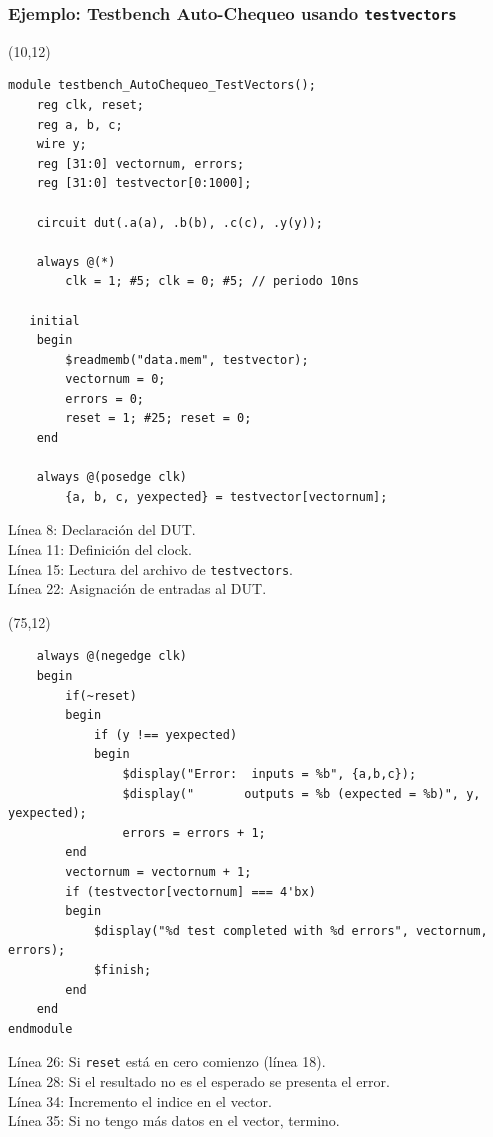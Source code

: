 \documentclass[aspectratio=169]{beamer}
\begin{document}
\begin{frame}[fragile,t]
    \frametitle{Ejemplo: Testbench Auto-Chequeo usando \texttt{testvectors}}

    \begin{textblock}{55}(10,12)
\lstset{basicstyle=\tiny, columns=flexible, stepnumber=1, numbers=left}
\begin{lstlisting}
module testbench_AutoChequeo_TestVectors();
    reg clk, reset;
    reg a, b, c;
    wire y;
    reg [31:0] vectornum, errors;
    reg [31:0] testvector[0:1000];
    
    circuit dut(.a(a), .b(b), .c(c), .y(y));

    always @(*)
        clk = 1; #5; clk = 0; #5; // periodo 10ns
    
   initial
    begin
        $readmemb("data.mem", testvector);
        vectornum = 0;
        errors = 0;
        reset = 1; #25; reset = 0;
    end
    
    always @(posedge clk)
        {a, b, c, yexpected} = testvector[vectornum];
\end{lstlisting}
\scriptsize
\textcolor{verdeuca}{Línea 8:} Declaración del DUT.\\
\textcolor{verdeuca}{Línea 11:} Definición del clock.\\
\textcolor{verdeuca}{Línea 15:} Lectura del archivo de \texttt{testvectors}.\\
\textcolor{verdeuca}{Línea 22:} Asignación de entradas al DUT.\\
    \end{textblock}

    \begin{textblock}{75}(75,12)
\lstset{basicstyle=\tiny, columns=flexible, stepnumber=1, numbers=left, firstnumber=24}
\begin{lstlisting}
    always @(negedge clk)
    begin
        if(~reset)
        begin
            if (y !== yexpected)
            begin
                $display("Error:  inputs = %b", {a,b,c});
                $display("       outputs = %b (expected = %b)", y, yexpected);
                errors = errors + 1;
        end
        vectornum = vectornum + 1;
        if (testvector[vectornum] === 4'bx)
        begin
            $display("%d test completed with %d errors", vectornum, errors);
            $finish;
        end
    end
endmodule
\end{lstlisting}
\scriptsize
\textcolor{verdeuca}{Línea 26:} Si \texttt{reset} está en cero comienzo (línea 18).\\
\textcolor{verdeuca}{Línea 28:} Si el resultado no es el esperado se presenta el error.\\
\textcolor{verdeuca}{Línea 34:} Incremento el indice en el vector.\\
\textcolor{verdeuca}{Línea 35:} Si no tengo más datos en el vector, termino.\\
    \end{textblock}
\end{frame}
\end{document}
